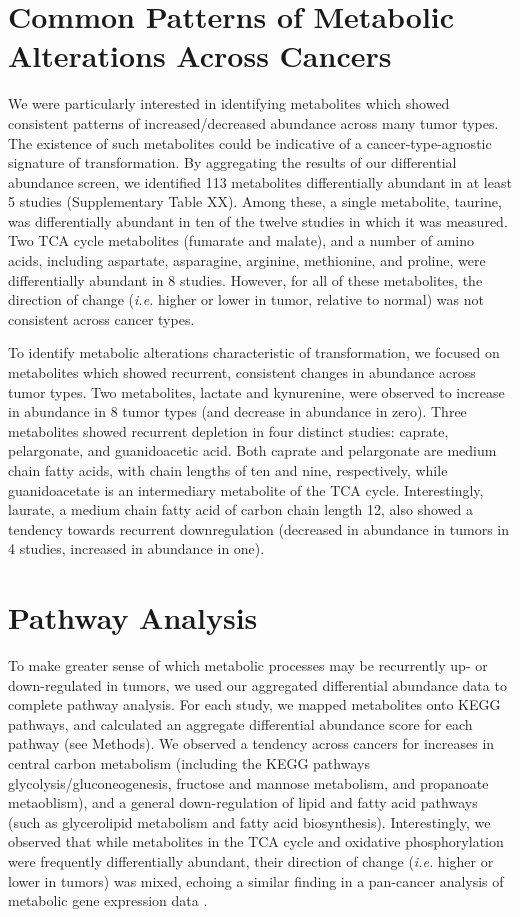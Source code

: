 \documentclass[10pt]{article}
\begin{document}
\section{ Common Patterns of Metabolic Alterations Across Cancers}
We were particularly interested in identifying metabolites which showed consistent patterns of increased/decreased abundance across many tumor types. The existence of such metabolites could be indicative of a cancer-type-agnostic signature of transformation. By aggregating the results of our differential abundance screen, we identified 113 metabolites differentially abundant in at least 5 studies (Supplementary Table XX). Among these, a single metabolite, taurine, was differentially abundant in ten of the twelve studies in which it was measured. Two TCA cycle metabolites (fumarate and malate), and a number of amino acids, including aspartate, asparagine, arginine, methionine, and proline, were differentially abundant in 8 studies. However, for all of these metabolites, the direction of change (\textit{i.e.} higher or lower in tumor, relative to normal) was not consistent across cancer types.

To identify metabolic alterations characteristic of transformation, we focused on metabolites which showed recurrent, consistent changes in abundance across tumor types. Two metabolites, lactate and kynurenine, were observed to increase in abundance in 8 tumor types (and decrease in abundance in zero). Three metabolites showed recurrent depletion in four distinct studies: caprate, pelargonate, and guanidoacetic acid. Both caprate and pelargonate are medium chain fatty acids, with chain lengths of ten and nine, respectively, while guanidoacetate is an intermediary metabolite of the TCA cycle. Interestingly, laurate, a medium chain fatty acid of carbon chain length 12, also showed a tendency towards recurrent downregulation (decreased in abundance in tumors in 4 studies, increased in abundance in one). 


\section{Pathway Analysis}
To make greater sense of which metabolic processes may be recurrently up- or down-regulated in tumors, we used our aggregated differential abundance data to complete pathway analysis. For each study, we mapped metabolites onto KEGG pathways, and calculated an aggregate differential abundance score for each pathway (see Methods). We observed a tendency across cancers for increases in central carbon metabolism (including the KEGG pathways glycolysis/gluconeogenesis, fructose and mannose metabolism, and propanoate metaoblism), and a general down-regulation of lipid and fatty acid pathways (such as glycerolipid metabolism and fatty acid biosynthesis). Interestingly, we observed that while metabolites in the TCA cycle and oxidative phosphorylation were frequently differentially abundant, their direction of change (\textit{i.e.} higher or lower in tumors) was mixed, echoing a similar finding in a pan-cancer analysis of metabolic gene expression data \cite{Hu2013}.
\end{document}
